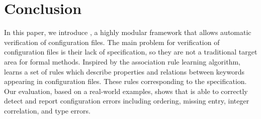 
\section{Conclusion}

In this paper, we introduce \app, a highly modular framework 
that allows automatic verification of configuration files.
The main problem for verification of configuration files is their lack
of specification, so they are not a traditional target area
for formal methods.
Inspired by the association rule learning algorithm, \app learns 
a set of rules which describe properties and relations between keywords appearing in configuration files. These rules corresponding to the specification.
Our evaluation, based on a real-world  examples, shows that \app is able to
correctly detect and report configuration errors
including ordering, missing entry, integer correlation,
and type errors.


